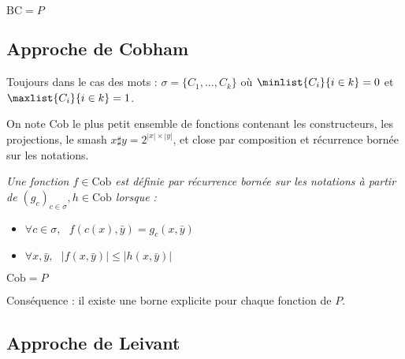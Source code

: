 \documentclass{report}
\begin{document}
		
		\begin{theorem}\cite{BellantoniCook1992}
			\label{thm:BC_equals_P}
			$\text{BC} = P$
		\end{theorem}

		
		\subsection{Approche de Cobham}
		\label{sec:Cobham}
			
		Toujours dans le cas des mots : $\sigma = \{ C_1, \dots, C_k \}$ où $\minlist{C_i}{i \in k} = 0$ et $\maxlist{C_i}{i \in k} = 1$.
		
		
		\begin{definition}
			\label{def:Cob}
			On note $\text{Cob}$ le plus petit ensemble de fonctions contenant les constructeurs, les projections, le smash $x \sharp y = 2^{\left| x \right| \times \left| y\right|}$, et close par composition et récurrence bornée sur les notations.
			
			
			
			\emph{Une fonction $f \in \text{Cob}$ est définie par récurrence bornée sur les notations à partir de $(g_c)_{c \in \sigma}, h \in \text{Cob}$ lorsque :}
			
			\begin{itemize}[itemsep=-1mm]
				\item 	$\forall c \in \sigma, \:\:\: f\left( c(x), \bar{y} \right) = g_c\left( x, \bar{y} \right)$
				\item 	$\forall x, \bar{y}, \:\:\: \left| f \left( x, \bar{y} \right) \right| \leq \left| h \left( x, \bar{y} \right) \right|$
			\end{itemize}
			
		\end{definition}
		
		
		\begin{theorem}[Cobham]
			\label{thm:Cob_equals_P}
			$\text{Cob} = P$
		\end{theorem}
		
		
		Conséquence : il existe une borne explicite pour chaque fonction de $P$. 
		
		
		
		\subsection{Approche de Leivant}
		\label{subsec:Leivant}
	
\end{document}

